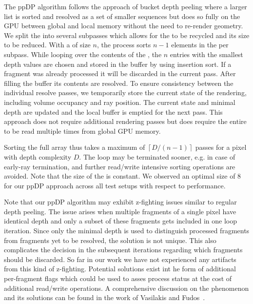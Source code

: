 \documentclass{egpubl}
\newcommand{\dloop}{ppDP}
\begin{document}
The \dloop{} algorithm follows the approach of bucket depth peeling where a larger list is sorted and resolved as a set of smaller sequences but does so fully on the GPU between global and local memory without the need to re-render geometry. 
We split the \sResolve{} into several subpasses which allows for the \bArray{} to be recycled and its size to be reduced. 
With a \bArray{} of size $n$, the process sorts $n-1$ elements in the \bFraglist{} per subpass. 
While looping over the contents of the \bFraglist{}, the $n$ entries with the smallest depth values are chosen and stored in the buffer by using insertion sort.
If a fragment was already processed it will be discarded in the current pass.
After filling the buffer its contents are resolved. 
To ensure consistency between the individual resolve passes, we temporarily store the current state of the rendering, including volume occupancy and ray position.
The current state and minimal depth are updated and the local buffer is emptied for the next pass. 
This approach does not require additional rendering passes but does require the entire \bFraglist{} to be read multiple times from global GPU memory. 

Sorting the full array thus takes a maximum of $\left\lceil D/(n-1)\right\rceil$ passes for a pixel with depth complexity $D$. 
The loop may be terminated sooner, e.g.{} in case of early-ray termination, and further read/write intensive sorting operations are avoided. 
Note that the size of the \bArray{} is constant. 
We observed an optimal \bArray{} size of $8$ for our \dloop{} approach across all test setups with respect to performance. 

Note that our \dloop{} algorithm may exhibit z-fighting issues similar to regular depth peeling. 
The issue arises when multiple fragments of a single pixel have identical depth and only a subset of these fragments gets included in one loop iteration. 
Since only the minimal depth is used to distinguish processed fragments from fragments yet to be resolved, the solution is not unique.
This also complicates the decision in the subsequent iterations regarding which fragments should be discarded.
So far in our work we have not experienced any artifacts from this kind of z-fighting. 
Potential solutions exist int he form of additional per-fragment flags which could be used to asses process status at the cost of additional read/write operations. 
A comprehensive discussion on the phenomenon and its solutions can be found in the work of Vasilakis and Fudos~\cite{Vasilakis2013}. 
\end{document}
